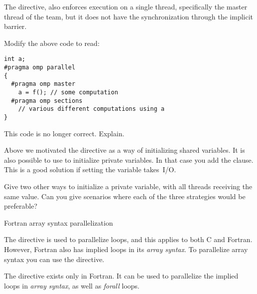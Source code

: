 The  directive, also enforces execution
on a single thread, specifically the master thread of the team,
but it does not have the synchronization through the implicit barrier.

\begin{exercise}
  Modify the above code to read:
\begin{verbatim}
int a;
#pragma omp parallel
{
  #pragma omp master
    a = f(); // some computation
  #pragma omp sections
    // various different computations using a
}
\end{verbatim}
  This code is no longer correct. Explain.
\end{exercise}

Above we motivated the  directive as a way of initializing
shared variables. It is also possible to use  to initialize
private variables. In that case you add the 
clause. This is a good solution if setting the variable takes~I/O.

\begin{exercise}
  Give two other ways to initialize a private variable, with all
  threads receiving the same value. Can you give scenarios where each
  of the three strategies would be preferable?
\end{exercise}

 {Fortran array syntax parallelization}
\label{sec:fortran-workshare}

The  directive is used to parallelize loops,
and this applies to both C and Fortran. However, Fortran also
has implied loops in its \emph{array syntax}.
To parallelize array syntax you can use the 
directive.

The  directive exists only in Fortran.
It can be used to parallelize
the implied loops in \emph{array syntax},
as well as  \emph{forall} loops.

